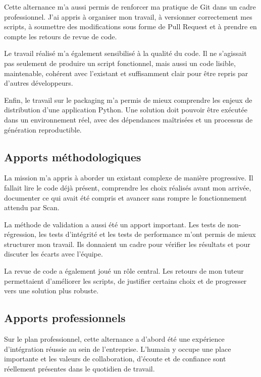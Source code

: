 Cette alternance m'a aussi permis de renforcer ma pratique de Git dans un cadre
professionnel. J'ai appris à organiser mon travail, à versionner correctement mes scripts, à soumettre des
modifications sous forme de Pull Request et à prendre en compte les retours de
revue de code.

Le travail réalisé m'a également sensibilisé à la qualité du code. Il ne
s'agissait pas seulement de produire un script fonctionnel, mais aussi un code
lisible, maintenable, cohérent avec l'existant et suffisamment clair pour être
repris par d'autres développeurs.

Enfin, le travail sur le packaging m'a permis de mieux comprendre les enjeux de
distribution d'une application Python. Une solution doit pouvoir être exécutée
dans un environnement réel, avec des dépendances maîtrisées et un processus de
génération reproductible.

\subsection{Apports méthodologiques}
\label{subsec:apports_methodologiques}

La mission m'a appris à aborder un existant complexe de manière progressive. Il
fallait lire le code déjà présent, comprendre les choix réalisés avant mon
arrivée, documenter ce qui avait été compris et avancer sans rompre le
fonctionnement attendu par Scan.

La méthode de validation a aussi été un apport important. Les tests de
non-régression, les tests d'intégrité et les tests de performance m'ont permis
de mieux structurer mon travail. Ils donnaient un cadre pour vérifier les
résultats et pour discuter les écarts avec l'équipe.

La revue de code a également joué un rôle central. Les retours de mon tuteur
permettaient d'améliorer les scripts, de justifier certains choix et de
progresser vers une solution plus robuste.

\subsection{Apports professionnels}
\label{subsec:apports_professionnels}

Sur le plan professionnel, cette alternance a d'abord été une expérience
d'intégration réussie au sein de l'entreprise. L'humain y occupe une place
importante et les valeurs de collaboration, d'écoute et de confiance sont
réellement présentes dans le quotidien de travail.

